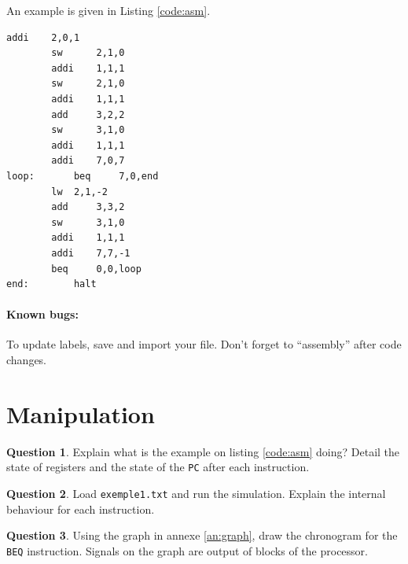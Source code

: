 \documentclass[10pt,a4paper]{article}
\theoremstyle{definition}%
\newtheorem{Q}{Question}[] %
\begin{document}
An example is given in Listing \vref{code:asm}.

\lstset{numbers=left, numberstyle=\tiny, stepnumber=5, numbersep=5pt, captionpos=b,style=customasm}
\begin{lstlisting}[float=h!,caption=Example code,label=code:asm,style=customasm]
		addi 	2,0,1	
		sw   	2,1,0
		addi 	1,1,1
		sw   	2,1,0			
		addi 	1,1,1
		add  	3,2,2
		sw   	3,1,0
		addi 	1,1,1
		addi 	7,0,7	
loop: 		beq  	7,0,end
		lw	2,1,-2
		add 	3,3,2	
		sw   	3,1,0
		addi 	1,1,1
		addi 	7,7,-1
		beq  	0,0,loop
end: 		halt
\end{lstlisting}

\paragraph{Known bugs:} To update labels, save and import your file. Don't forget to ``assembly'' after code changes.
\newpage

\section{Manipulation}




\begin{Q}
Explain what is the example on listing \vref{code:asm} doing? Detail the state of registers and the state of the \verb!PC! after each instruction.
\end{Q}

\begin{Q}
Load \verb!exemple1.txt! and run the simulation. Explain the internal behaviour for each instruction.
\end{Q}

\begin{Q}
Using the graph in annexe \vref{an:graph}, draw the chronogram for the \verb!BEQ! instruction. Signals on the graph are output of blocks of the processor.
\end{Q}
\end{document}

